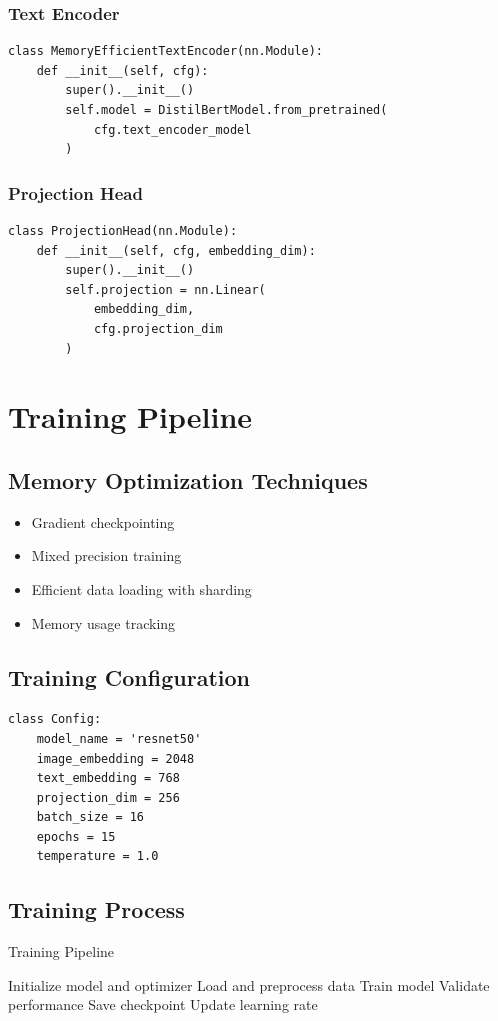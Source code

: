 \documentclass[11pt,a4paper]{article}
\begin{document}
\subsubsection{Text Encoder}
\begin{lstlisting}
class MemoryEfficientTextEncoder(nn.Module):
    def __init__(self, cfg):
        super().__init__()
        self.model = DistilBertModel.from_pretrained(
            cfg.text_encoder_model
        )
\end{lstlisting}

\subsubsection{Projection Head}
\begin{lstlisting}
class ProjectionHead(nn.Module):
    def __init__(self, cfg, embedding_dim):
        super().__init__()
        self.projection = nn.Linear(
            embedding_dim, 
            cfg.projection_dim
        )
\end{lstlisting}

\section{Training Pipeline}
\subsection{Memory Optimization Techniques}
\begin{itemize}
    \item Gradient checkpointing
    \item Mixed precision training
    \item Efficient data loading with sharding
    \item Memory usage tracking
\end{itemize}

\subsection{Training Configuration}
\begin{lstlisting}
class Config:
    model_name = 'resnet50'
    image_embedding = 2048
    text_embedding = 768
    projection_dim = 256
    batch_size = 16
    epochs = 15
    temperature = 1.0
\end{lstlisting}

\subsection{Training Process}
\begin{algorithm}[H]
\caption{Training Pipeline}
\begin{algorithmic}[1]
\State Initialize model and optimizer
\State Load and preprocess data
    \State Train model
    \State Validate performance
        \State Save checkpoint
    \EndIf
    \State Update learning rate
\EndFor
\end{algorithmic}
\end{algorithm}
\end{document}
